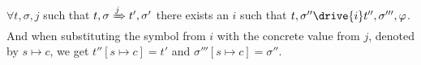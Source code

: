 \begin{lemma}
  \label{lem:completeDrive}
  $\forall t,\sigma,j$ such that $t,\sigma \xRightarrow[]{j} t',\sigma'$
  there exists an $i$ such that $t,\sigma''\drive{i} t'',\sigma''',\phi$.
  And when substituting the symbol from $i$ with the concrete value from $j$, denoted by $s\mapsto c$,
  we get $t''[s\mapsto c] = t'$ and $\sigma'''[s\mapsto c]=\sigma''$.
\end{lemma}
